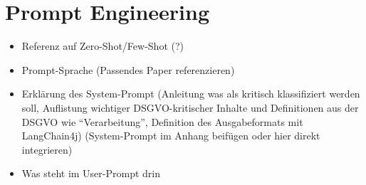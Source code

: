 \section{Prompt Engineering}\label{sec:prompt-engineering}

\begin{itemize}
    \item Referenz auf Zero-Shot/Few-Shot (?)
    \item Prompt-Sprache (Passendes Paper referenzieren)
    \item Erklärung des System-Prompt (Anleitung was als kritisch klassifiziert werden soll, Auflistung wichtiger DSGVO-kritischer Inhalte und Definitionen aus der DSGVO wie ``Verarbeitung'', Definition des Ausgabeformats mit LangChain4j) (System-Prompt im Anhang beifügen oder hier direkt integrieren)
    \item Was steht im User-Prompt drin
\end{itemize}